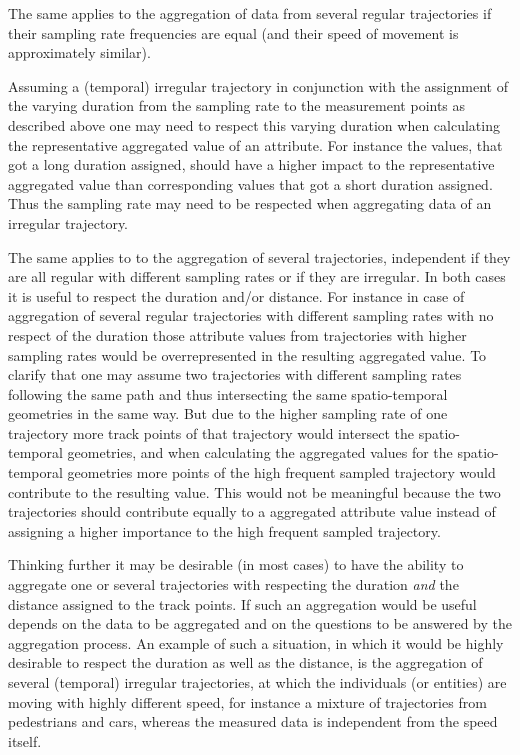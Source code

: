 \documentclass[12pt, oneside, a4paper]{scrbook}
\begin{document}
The same applies to the aggregation of data from several regular trajectories if their sampling rate frequencies are equal (and their speed of movement is approximately similar).
\par\medskip
Assuming a (temporal) irregular trajectory in conjunction with the assignment of the varying duration from the sampling rate to the measurement points as described above one may need to respect this varying duration when calculating the representative aggregated value of an attribute. 
For instance the values, that got a long duration assigned, should have a higher impact to the representative aggregated value than corresponding values that got a short duration assigned.
Thus the sampling rate may need to be respected when aggregating data of an irregular trajectory. 
\par\medskip
The same applies to to the aggregation of several trajectories, independent if they are all regular with different sampling rates or if they are irregular. 
In both cases it is useful to respect the duration and/or distance. 
For instance in case of aggregation of several regular trajectories with different sampling rates with no respect of the duration those attribute values from trajectories with higher sampling rates would be overrepresented in the resulting aggregated value.
To clarify that one may assume two trajectories with different sampling rates following the same path and thus intersecting the same spatio-temporal geometries in the same way.
But due to the higher sampling rate of one trajectory more track points of that trajectory would intersect the spatio-temporal geometries, and when calculating the aggregated values for the spatio-temporal geometries more points of the high frequent sampled trajectory would contribute to the resulting value. 
This would not be meaningful because the two trajectories should contribute equally to a aggregated attribute value instead of assigning a higher importance to the high frequent sampled trajectory.
\par\medskip
Thinking further it may be desirable (in most cases) to have the ability to aggregate one or several trajectories with respecting the duration \textit{and} the distance assigned to the track points. 
If such an aggregation would be useful depends on the data to be aggregated and on the questions to be answered by the aggregation process. 
An example of such a situation, in which it would be highly desirable to respect the duration as well as the distance, is the aggregation of several (temporal) irregular trajectories, at which the individuals (or entities) are moving with highly different speed, for instance a mixture of trajectories from pedestrians and cars, whereas the measured data is independent from the speed itself.
\end{document}

